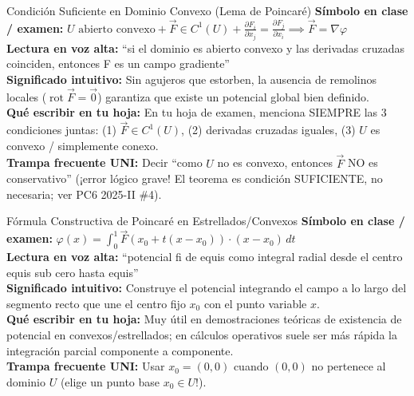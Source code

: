 \documentclass[11pt,a4paper]{article}
\begin{document}
\begin{definicionbox}{Condición Suficiente en Dominio Convexo (Lema de Poincaré)}
\textbf{Símbolo en clase / examen:} $U \text{ abierto convexo} + \vec{F} \in C^1(U) + \frac{\partial F_i}{\partial x_j} = \frac{\partial F_j}{\partial x_i} \implies \vec{F} = \nabla\varphi$\\[0.15cm]
\textbf{Lectura en voz alta:} ``si el dominio es abierto convexo y las derivadas cruzadas coinciden, entonces F es un campo gradiente''\\[0.12cm]
\textbf{Significado intuitivo:} Sin agujeros que estorben, la ausencia de remolinos locales ($\operatorname{rot}\vec{F}=\vec{0}$) garantiza que existe un potencial global bien definido.\\[0.12cm]
\textbf{Qué escribir en tu hoja:} En tu hoja de examen, menciona SIEMPRE las 3 condiciones juntas: (1) $\vec{F} \in C^1(U)$, (2) derivadas cruzadas iguales, (3) $U$ es convexo / simplemente conexo.\\[0.12cm]
\textbf{Trampa frecuente UNI:} Decir ``como $U$ no es convexo, entonces $\vec{F}$ NO es conservativo'' (¡error lógico grave! El teorema es condición SUFICIENTE, no necesaria; ver PC6 2025-II \#4).
\end{definicionbox}

\begin{definicionbox}{Fórmula Constructiva de Poincaré en Estrellados/Convexos}
\textbf{Símbolo en clase / examen:} $\varphi(x) = \int_0^1 \vec{F}(x_0 + t(x - x_0)) \cdot (x - x_0)\,dt$\\[0.15cm]
\textbf{Lectura en voz alta:} ``potencial fi de equis como integral radial desde el centro equis sub cero hasta equis''\\[0.12cm]
\textbf{Significado intuitivo:} Construye el potencial integrando el campo a lo largo del segmento recto que une el centro fijo $x_0$ con el punto variable $x$.\\[0.12cm]
\textbf{Qué escribir en tu hoja:} Muy útil en demostraciones teóricas de existencia de potencial en convexos/estrellados; en cálculos operativos suele ser más rápida la integración parcial componente a componente.\\[0.12cm]
\textbf{Trampa frecuente UNI:} Usar $x_0 = (0,0)$ cuando $(0,0)$ no pertenece al dominio $U$ (elige un punto base $x_0 \in U$!).
\end{definicionbox}
\end{document}
